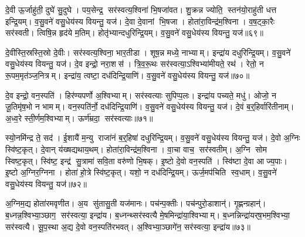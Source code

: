 दे॒वी ऊ॒र्जाहु॑ती॒ दुघे॑ सु॒दुघे। पय॒सेन्द्र॒ सर॑स्वत्य॒श्विना॑ भि॒षजा॑वत। शु॒क्रन्न ज्योति॒ स्तन॑यो॒राहु॑ती धत्त इन्द्रि॒यम्। व॒सु॒वने॑ वसु॒धेय॑स्य वियन्तु॒ यज॑। दे॒वा दे॒वानां भि॒षजा। होता॑रा॒विन्द्र॑म॒श्विना। व॒ष॒ट्का॒रैः सर॑स्वती। त्विषि॒न्न हृद॑ये म॒तिम्। होतृ॑भ्यान्दधुरिन्द्रि॒यम्। व॒सु॒वने॑ वसु॒धेय॑स्य वियन्तु॒ यज॑॥६९॥

दे॒वीस्ति॒स्रस्ति॒स्रो दे॒वीः। सर॑स्वत्य॒श्विना॒ भार॒तीडा। शूष॒न्न मध्ये॒ नाभ्याम्। इन्द्रा॑य दधुरिन्द्रि॒यम्। व॒सु॒वने॑ वसु॒धेय॑स्य वियन्तु॒ यज॑। दे॒व इन्द्रो॒ नरा॒शस॑। त्रि॒व॒रू॒थः सर॑स्वत्या॒ऽश्विभ्या॑मीयते॒ रथ॑। रेतो॒ न रू॒पम॒मृत॑ञ्ज॒नित्रम्। इन्द्रा॑य॒ त्वष्टा॒ दध॑दिन्द्रि॒याणि॑। व॒सु॒वने॑ वसु॒धेय॑स्य वियन्तु॒ यज॑॥७०॥

दे॒व इन्द्रो॒ वन॒स्पति॑। हिर॑ण्यपर्णो अ॒श्विभ्याम्। सर॑स्वत्याः सुपिप्प॒लः। इन्द्रा॑य पच्यते॒ मधु॑। ओजो॒ न जू॒तिमृ॑ष॒भो न भामम्। वन॒स्पति॑र्नो॒ दध॑दिन्द्रि॒याणि॑। व॒सु॒वने॑ वसु॒धेय॑स्य वियन्तु॒ यज॑। दे॒वं ब॒र्॒हिर्वारि॑तीनाम्। अ॒ध्व॒रे स्ती॒र्णम॒श्विभ्याम्। ऊर्ण॑म्रदा॒ सर॑स्वत्याः॥७१॥

स्यो॒नमि॑न्द्र ते॒ सद॑। ई॒शायै॑ म॒न्यु राजा॑नं ब॒र्॒हिषा॑ दधुरिन्द्रि॒यम्। व॒सु॒वने॑ वसु॒धेय॑स्य वियन्तु॒ यज॑। दे॒वो अ॒ग्निः स्वि॑ष्ट॒कृत्। दे॒वान् य॑ख्षद्यथाय॒थम्। होता॑रा॒विन्द्र॑म॒श्विना। वा॒चा वाच॒ सर॑स्वतीम्। अ॒ग्नि सोम स्विष्ट॒कृत्। स्वि॑ष्ट॒ इन्द्र॑ सु॒त्रामा॑ सवि॒ता वरु॑णो भि॒षक्। इ॒ष्टो दे॒वो वन॒स्पति॑। स्वि॑ष्टा दे॒वा आज्य॒पाः। इ॒ष्टो अ॒ग्निर॒ग्निना। होता॑ हो॒त्रे स्वि॑ष्ट॒कृत्। यशो॒ न दध॑दिन्द्रि॒यम्। ऊर्ज॒मप॑चिति स्व॒धाम्। व॒सु॒वने॑ वसु॒धेय॑स्य वियन्तु॒ यज॑॥७२॥\anuvakamend[द्वारो॑ दधुरिन्द्रि॒यव्वँ॑सु॒वने॑ वसु॒धेय॑स्य वियन्तु॒ यज॒ जोष्ट्रीभ्यान्दधुरिन्द्रि॒यव्वँ॑सु॒वने॑ वसु॒धेय॑स्य वियन्तु॒ यज॒ होतृ॑भ्यान्दधुरिन्द्रि॒यव्वँ॑सु॒वने॑ वसु॒धेय॑स्य वियन्तु॒ यजेन्द्रि॒याणि॑ वसु॒वने॑ वसु॒धेय॑स्य वियन्तु॒ यज॒ सर॑स्वत्या॒ वन॒स्पति॒ष्षट्च॑ (दे॒वं ब॒र्॒हिर्दे॒वीर्द्वारो॑ दे॒वी उ॒षासा॑व॒श्विना॑ दे॒वी जोष्ट्री॑ दे॒वी ऊ॒र्जाहु॑ती दे॒वा दे॒वानां भि॒षजा॑ वषट्का॒रैर्दे॒वीस्ति॒स्रस्ति॒स्रो दे॒वीर्दे॒व इन्द्रो॒ नरा॒शसो॑ दे॒व इन्द्रो॒ वन॒स्पति॑र्दे॒वं ब॒र्॒हिर्वारि॑तीनान्दे॒वो अ॒ग्निः स्वि॑ष्ट॒कृद्दे॒वान्। स॒मिधा॒ऽग्निन्दे॒वं ब॒र्॒हिः सर॑स्वत्य॒श्विना॒ सर्व॑ वियन्तु। द्वार॑स्ति॒स्रः सर्व॑वियन्तु। अ॒ज इन्द्र॒मोजो॒ऽग्निं पर॒ सर॑स्वतीम्। नक्तं॒ पूर्व॒ सर॑स्वति। अ॒न्यत्र॒ सर॑स्वती। भि॒षक्पूर्व॑न्दुह इन्द्रि॒यम्। अ॒न्यत्र॑ दधुरिन्द्रि॒यम्। सौ॒त्रा॒म॒ण्या सु॑तासु॒ती। अ॒ञ्जन्त्य॒यय्यँज॑मानः ॥ )]

अ॒ग्निम॒द्य होता॑रमवृणीत। अ॒य सु॑तासु॒ती यज॑मानः। पच॑न्प॒क्तीः। पच॑न्पुरो॒डाशान्॑। गृ॒ह्णन्ग्रहान्॑। ब॒ध्नन्न॒श्विभ्या॒ञ्छाग॒ सर॑स्वत्या॒ इन्द्रा॑य। ब॒ध्नन्थ्सर॑स्वत्यै मे॒षमिन्द्रा॑या॒श्विभ्याम्। ब॒ध्नन्निन्द्रा॑यर्‌ष॒भम॒श्विभ्या॒ सर॑स्वत्यै। सू॒प॒स्था अ॒द्य दे॒वो वन॒स्पति॑रभवत्। अ॒श्विभ्या॒ञ्छागे॑न॒ सर॑स्वत्या॒ इन्द्रा॑य॥७३॥

